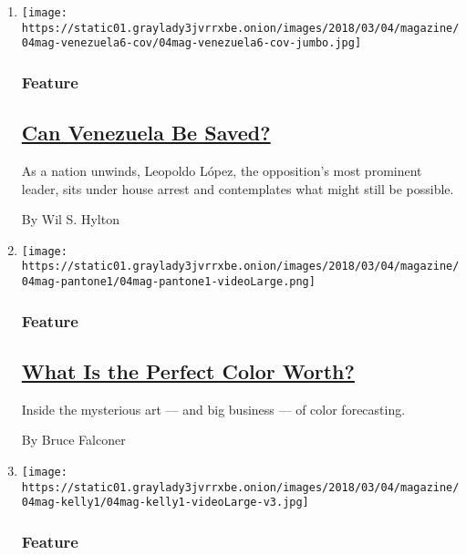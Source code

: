 \begin{enumerate}
\def\labelenumi{\arabic{enumi}.}
\item
  \texttt{[image: https://static01.graylady3jvrrxbe.onion/images/2018/03/04/magazine/04mag-venezuela6-cov/04mag-venezuela6-cov-jumbo.jpg]}

  \hypertarget{feature}{%
  \subsubsection{Feature}\label{feature}}

  \hypertarget{can-venezuela-be-saved}{%
  \subsection{\texorpdfstring{\href{/2018/03/01/magazine/can-venezuela-be-saved.html}{Can
  Venezuela Be
  Saved?}}{Can Venezuela Be Saved?}}\label{can-venezuela-be-saved}}

  As a nation unwinds, Leopoldo López, the opposition's most prominent
  leader, sits under house arrest and contemplates what might still be
  possible.

  By Wil S. Hylton
\item
  \texttt{[image: https://static01.graylady3jvrrxbe.onion/images/2018/03/04/magazine/04mag-pantone1/04mag-pantone1-videoLarge.png]}

  \hypertarget{feature-1}{%
  \subsubsection{Feature}\label{feature-1}}

  \hypertarget{what-is-the-perfect-color-worth}{%
  \subsection{\texorpdfstring{\href{/2018/02/28/magazine/what-is-the-perfect-color-worth.html}{What
  Is the Perfect Color
  Worth?}}{What Is the Perfect Color Worth?}}\label{what-is-the-perfect-color-worth}}

  Inside the mysterious art --- and big business --- of color
  forecasting.

  By Bruce Falconer
\item
  \texttt{[image: https://static01.graylady3jvrrxbe.onion/images/2018/03/04/magazine/04mag-kelly1/04mag-kelly1-videoLarge-v3.jpg]}

  \hypertarget{feature-2}{%
  \subsubsection{Feature}\label{feature-2}}


\end{enumerate}
